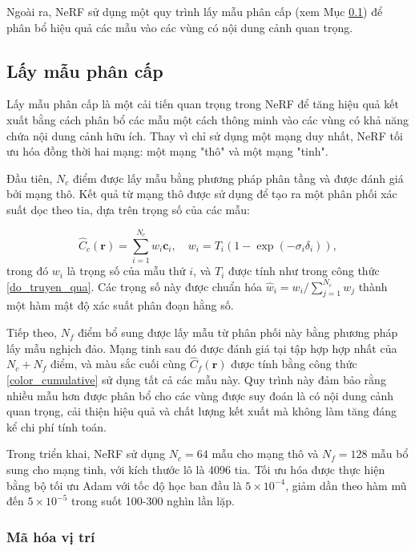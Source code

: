 Ngoài ra, NeRF sử dụng một quy trình lấy mẫu phân cấp (xem Mục \ref{subsubsec:hierarchical_sampling}) để phân bổ hiệu quả các mẫu vào các vùng có nội dung cảnh quan trọng.

\subsection{Lấy mẫu phân cấp} \label{subsubsec:hierarchical_sampling}

Lấy mẫu phân cấp là một cải tiến quan trọng trong NeRF để tăng hiệu quả kết xuất bằng cách phân bổ các mẫu một cách thông minh vào các vùng có khả năng chứa nội dung cảnh hữu ích. Thay vì chỉ sử dụng một mạng duy nhất, NeRF tối ưu hóa đồng thời hai mạng: một mạng "thô" và một mạng "tinh".

Đầu tiên, $N_c$ điểm được lấy mẫu bằng phương pháp phân tầng và được đánh giá bởi mạng thô. Kết quả từ mạng thô được sử dụng để tạo ra một phân phối xác suất dọc theo tia, dựa trên trọng số của các mẫu:

\begin{equation}
\hat{C}_c(\mathbf{r}) = \sum_{i=1}^{N_c} w_i \mathbf{c}_i, \quad w_i = T_i \left(1 - \exp(-\sigma_i \delta_i)\right),
\end{equation}
trong đó $w_i$ là trọng số của mẫu thứ $i$, và $T_i$ được tính như trong công thức \ref{do_truyen_qua}. Các trọng số này được chuẩn hóa $\hat{w}_i = w_i / \sum_{j=1}^{N_c} w_j$ thành một hàm mật độ xác suất phân đoạn hằng số.

Tiếp theo, $N_f$ điểm bổ sung được lấy mẫu từ phân phối này bằng phương pháp lấy mẫu nghịch đảo. Mạng tinh sau đó được đánh giá tại tập hợp hợp nhất của $N_c + N_f$ điểm, và màu sắc cuối cùng $\hat{C}_f(\mathbf{r})$ được tính bằng công thức \ref{color_cumulative} sử dụng tất cả các mẫu này. Quy trình này đảm bảo rằng nhiều mẫu hơn được phân bổ cho các vùng được suy đoán là có nội dung cảnh quan trọng, cải thiện hiệu quả và chất lượng kết xuất mà không làm tăng đáng kể chi phí tính toán.

Trong triển khai, NeRF sử dụng $N_c = 64$ mẫu cho mạng thô và $N_f = 128$ mẫu bổ sung cho mạng tinh, với kích thước lô là 4096 tia. Tối ưu hóa được thực hiện bằng bộ tối ưu Adam với tốc độ học ban đầu là $5 \times 10^{-4}$, giảm dần theo hàm mũ đến $5 \times 10^{-5}$ trong suốt 100-300 nghìn lần lặp.

\subsubsection{Mã hóa vị trí} \label{subsubsec:positional_encoding}

